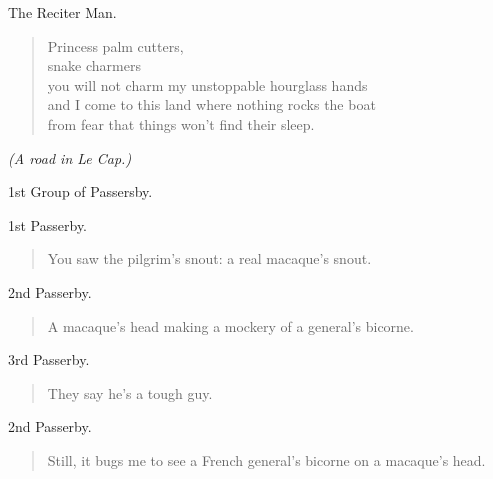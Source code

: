 \documentclass[letterpaper,article,12pt,oneside,notitlepage]{memoir}
\begin{document}
\begin{center}The Reciter Man.\end{center}

\begin{verse}
Princess palm cutters, \\
snake charmers \\
you will not charm my unstoppable hourglass hands \\
and I come to this land where nothing rocks the boat \\
from fear that things won't find their sleep. \\
\end{verse}

\clearpage

\textit{(A road in Le Cap.)}

\begin{center}1st Group of Passersby.\end{center}

\begin{center}1st Passerby.\end{center}

\begin{verse}
You saw the pilgrim's snout: a real macaque's snout. \\
\end{verse}

\begin{center}2nd Passerby.\end{center}

\begin{verse}
A macaque's head making a mockery of a general's bicorne. \\
\end{verse}

\begin{center}3rd Passerby.\end{center}

\begin{verse}
They say he's a tough guy. \\
\end{verse}

\begin{center}2nd Passerby.\end{center}

\begin{verse}
Still, it bugs me to see a French general's bicorne on a macaque's head. \\
\end{verse}
\end{document}
